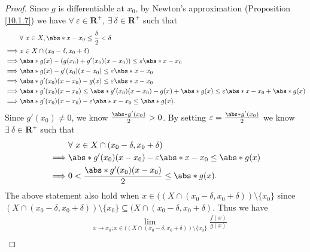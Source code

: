 \begin{proof}
    Since \(g\) is differentiable at \(x_0\), by Newton's approximation (Proposition \ref{10.1.7}) we have \(\forall\ \varepsilon \in \mathbf{R}^+\), \(\exists\ \delta \in \mathbf{R}^+\) such that
    \begin{align*}
                 & \forall\ x \in X, \abs*{x - x_0} \leq \frac{\delta}{2} < \delta                                                         \\
        \implies & x \in X \cap (x_0 - \delta, x_0 + \delta)                                                                               \\
        \implies & \abs*{g(x) - (g(x_0) + g'(x_0)(x - x_0))} \leq \varepsilon \abs*{x - x_0}                                               \\
        \implies & \abs*{g(x) - g'(x_0)(x - x_0)} \leq \varepsilon \abs*{x - x_0}                                                          \\
        \implies & \abs*{g'(x_0)(x - x_0) - g(x)} \leq \varepsilon \abs*{x - x_0}                                                          \\
        \implies & \abs*{g'(x_0)(x - x_0)} \leq \abs*{g'(x_0)(x - x_0) - g(x)} + \abs*{g(x)} \leq \varepsilon \abs*{x - x_0} + \abs*{g(x)} \\
        \implies & \abs*{g'(x_0)(x - x_0)} - \varepsilon \abs*{x - x_0} \leq \abs*{g(x)}.
    \end{align*}
    Since \(g'(x_0) \neq 0\), we know \(\frac{\abs*{g'(x_0)}}{2} > 0\).
    By setting \(\varepsilon = \frac{\abs*{g'(x_0)}}{2}\) we know \(\exists\ \delta \in \mathbf{R}^+\) such that
    \begin{align*}
                 & \forall\ x \in X \cap (x_0 - \delta, x_0 + \delta)                    \\
        \implies & \abs*{g'(x_0)(x - x_0)} - \varepsilon \abs*{x - x_0} \leq \abs*{g(x)} \\
        \implies & 0 < \frac{\abs*{g'(x_0) (x - x_0)}}{2} \leq \abs*{g(x)}.
    \end{align*}
    The above statement also hold when \(x \in ((X \cap (x_0 - \delta, x_0 + \delta)) \setminus \{x_0\}\) since \((X \cap (x_0 - \delta, x_0 + \delta)) \setminus \{x_0\} \subseteq (X \cap (x_0 - \delta, x_0 + \delta)\).
    Thus we have
    \begin{align*}
          & \lim_{x \to x_0 ; x \in ((X \cap (x_0 - \delta, x_0 + \delta)) \setminus \{x_0\}} \frac{f(x)}{g(x)}                                                                                                                                                                           \\

\end{align*}
\end{proof}
